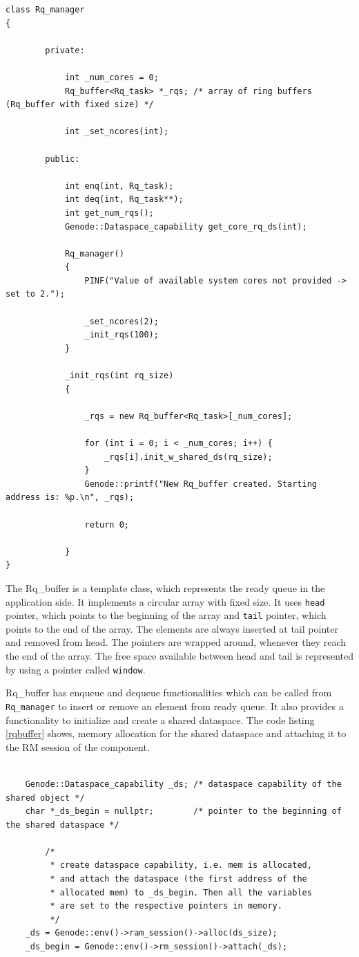 \begin{lstlisting}[caption={Rq\_manager class},label={rqmanager}, style=customcpp]
class Rq_manager
{	

		private:

			int _num_cores = 0;
			Rq_buffer<Rq_task> *_rqs; /* array of ring buffers (Rq_buffer with fixed size) */
			
			int _set_ncores(int);

		public:

			int enq(int, Rq_task);
			int deq(int, Rq_task**);
			int get_num_rqs();
			Genode::Dataspace_capability get_core_rq_ds(int);

			Rq_manager()
			{
				PINF("Value of available system cores not provided -> set to 2.");

				_set_ncores(2);
				_init_rqs(100);
			}

			_init_rqs(int rq_size)
			{

				_rqs = new Rq_buffer<Rq_task>[_num_cores];

				for (int i = 0; i < _num_cores; i++) {
					_rqs[i].init_w_shared_ds(rq_size);
				}
				Genode::printf("New Rq_buffer created. Starting address is: %p.\n", _rqs);

				return 0;

			}
}
\end{lstlisting}

The Rq\_buffer is a template class, which represents the ready queue in the application side. It implements a circular array with fixed size. It uses \texttt{head} pointer, which points to the beginning of the array and \texttt{tail} pointer, which points to the end of the array. The elements are always inserted at tail pointer and removed from head. The pointers are wrapped around, whenever they reach the end of the array. The free space available between head and tail is represented by using a pointer called \texttt{window}. 

Rq\_buffer has enqueue and dequeue functionalities which can be called from \texttt{Rq\_manager} to insert or remove an element from ready queue. It also provides a functionality to initialize and create a shared dataspace. The code listing \ref{rqbuffer} shows, memory allocation for the shared dataspace and attaching it to the RM session of the component.

\begin{lstlisting}[caption={Allocating dataspace},label={rqbuffer}, style=customcpp]

	Genode::Dataspace_capability _ds; /* dataspace capability of the shared object */
	char *_ds_begin = nullptr;        /* pointer to the beginning of the shared dataspace */

		/* 
		 * create dataspace capability, i.e. mem is allocated,
		 * and attach the dataspace (the first address of the
		 * allocated mem) to _ds_begin. Then all the variables
		 * are set to the respective pointers in memory.
		 */
	_ds = Genode::env()->ram_session()->alloc(ds_size);
	_ds_begin = Genode::env()->rm_session()->attach(_ds);

\end{lstlisting}

